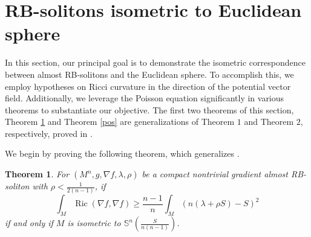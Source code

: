 \documentclass[a4paper, twoside, 10pt]{article}
\numberwithin{equation}{section}
\newtheorem{theorem}{Theorem}[section]
\theoremstyle{definition}
\begin{document}
\section{RB-solitons isometric to Euclidean sphere}\label{thm}
In this section, our principal goal is to demonstrate the isometric correspondence between almost RB-solitons and the Euclidean sphere. To accomplish this, we employ hypotheses on Ricci curvature in the direction of the potential vector field. Additionally, we leverage the Poisson equation significantly in various theorems to substantiate our objective.  The first two theorems of this section, 
Theorem \ref{riclb} and Theorem \ref{pos}
are generalizations of Theorem $1$ and Theorem $2$, respectively, proved in \cite{SDARSIS}.


We begin by proving the following theorem, which generalizes \cite[Theorem 2]{barros2012some}.
\begin{theorem}\label{riclb}
For $(M^n,g,\nabla f,\lambda,\rho)$ be a  compact nontrivial gradient almost RB-soliton with $\rho < \frac{1}{2(n-1)}$, if
\begin{equation}\label{sphere-cond}
\int_M \operatorname{Ric}(\nabla f,\nabla f) \geq \frac{n-1}{n}\int_M(n(\lambda+\rho S)-S)^2
\end{equation}
if and only if $M$ is isometric to $\mathbb{S}^n(\frac{S}{n(n-1)})$. 
\end{theorem}
\end{document}
